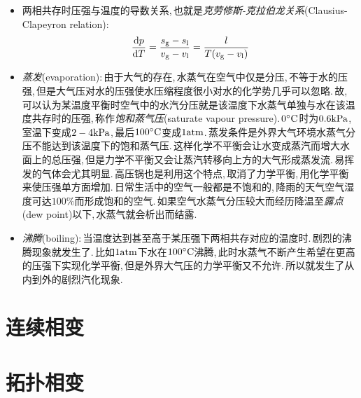 	\begin{itemize}
	\item 两相共存时压强与温度的导数关系,\,也就是\emph{克劳修斯-克拉伯龙关系}(Clausius-Clapeyron relation):
	\[\frac{\textrm{d} p}{\textrm{d} T}=\frac{s_{\rm g}-s_{\rm l}}{v_{\rm g}-v_{\rm l}}=\frac{l}{T(v_{\rm g}-v_{\rm l})}\]
	
	\item \emph{蒸发}(evaporation):\,由于大气的存在,\,水蒸气在空气中仅是分压,\,不等于水的压强,\,但是大气压对水的压强使水压缩程度很小对水的化学势几乎可以忽略.\,故,\,可以认为某温度平衡时空气中的水汽分压就是该温度下水蒸气单独与水在该温度共存时的压强,\,称作\emph{饱和蒸气压}(saturate vapour pressure).\,$0^\circ \mathrm{C}$时为$0.6{\rm kPa}$,\,室温下变成$2-4{\rm kPa}$,\,最后$100^\circ \mathrm{C}$变成$1{\rm atm}$.\,蒸发条件是外界大气环境水蒸气分压不能达到该温度下的饱和蒸气压.\,这样化学不平衡会让水变成蒸汽而增大水面上的总压强,\,但是力学不平衡又会让蒸汽转移向上方的大气形成蒸发流.\,易挥发的气体会尤其明显.\,高压锅也是利用这个特点,\,取消了力学平衡,\,用化学平衡来使压强单方面增加.\,日常生活中的空气一般都是不饱和的,\,降雨的天气空气湿度可达$100\%$而形成饱和的空气.\,如果空气水蒸气分压较大而经历降温至\emph{露点}(dew point)以下,\,水蒸气就会析出而结露.

	\item \emph{沸腾}(boiling):\,当温度达到甚至高于某压强下两相共存对应的温度时.\,剧烈的沸腾现象就发生了.\,比如$1{\rm atm}$下水在$100^\circ \mathrm{C}$沸腾,\,此时水蒸气不断产生希望在更高的压强下实现化学平衡,\,但是外界大气压的力学平衡又不允许.\,所以就发生了从内到外的剧烈汽化现象.
\end{itemize}

\section{连续相变}

\section{拓扑相变}